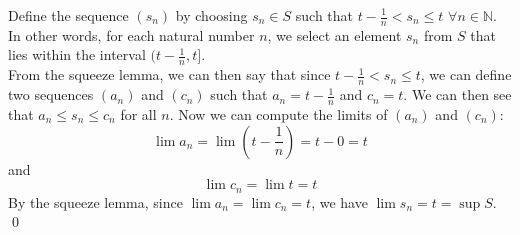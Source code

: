 \documentclass[12pt]{article}
\begin{document}
Define the sequence $(s_n)$ by choosing $s_n \in S$ such that $t - \frac{1}{n} < s_n \leq t$ $\forall n \in \mathbb{N}$. In other words, for each natural number $n$, we select an element $s_n$ from $S$ that lies within the interval $(t - \frac{1}{n}, t]$. \\

From the squeeze lemma, we can then say that since $t - \frac{1}{n} < s_n \leq t$, we can define two sequences $(a_n)$ and $(c_n)$ such that $a_n = t - \frac{1}{n}$ and $c_n = t$. We can then see that $a_n \leq s_n \leq c_n$ for all $n$. 
Now we can compute the limits of $(a_n)$ and $(c_n)$:
\[
\lim a_n = \lim (t - \frac{1}{n}) = t - 0 = t
\]
and
\[\lim c_n = \lim t = t
\]
By the squeeze lemma, since $\lim a_n = \lim c_n = t$, we have $\lim s_n = t = \sup S$.
\qed
\end{document}
